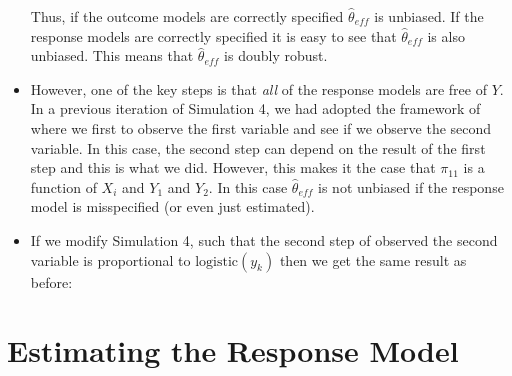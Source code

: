 \documentclass[12pt]{article}
\newcommand{\logistic}{{\text{logistic}}}
\begin{document}
\begin{itemize}
    Thus, if the outcome models are correctly specified $\hat \theta_{eff}$ is
    unbiased. If the response models are correctly specified it is easy to see
    that $\hat \theta_{eff}$ is also unbiased. This means that $\hat
    \theta_{eff}$ is doubly robust.

  \item However, one of the key steps is that \textit{all} of the response
    models are free of $Y$. In a previous iteration of Simulation 4, we had
    adopted the framework of \cite{robins1997non} where we first to observe the
    first variable and see if we observe the second variable. In this case, the
    second step can depend on the result of the first step and this is what we
    did. However, this makes it the case that $\pi_11$ is a function of $X_i$
    and $Y_1$ and $Y_2$. In this case $\hat \theta_{eff}$ is not unbiased if the
    response model is misspecified (or even just estimated).

  \item If we modify Simulation 4, such that the second step of observed the
    second variable is proportional to $\logistic(y_k)$ then we get the same
    result as before:

    
    
    
  
\end{itemize}

\newpage

\section*{Estimating the Response Model}
\end{document}
